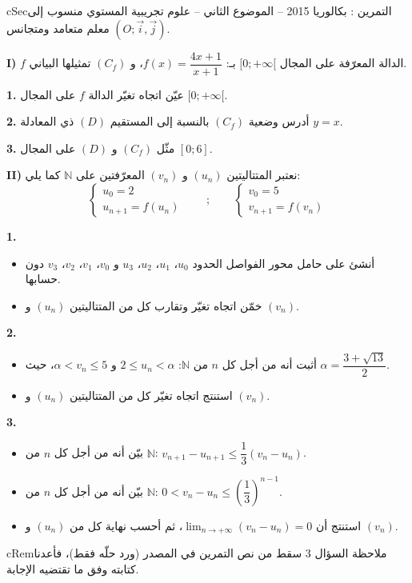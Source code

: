 \documentclass[12pt,a4paper]{article}
\newenvironment{BOX}[2]{\begin{otherlanguage}{english}\begin{arbox}{#1}{#2}}{\end{arbox}\end{otherlanguage}}
\newenvironment{molahada}[1][ملاحظة]{\begin{BOX}{cRem}{#1}}{\end{BOX}}
\newcounter{exo}
\newenvironment{tamrin}[1]{\stepcounter{exo}\begin{BOX}{cSec}{التمرين \theexo: #1}}{\end{BOX}}
\newcommand{\N}{\mathbb{N}}
\newcommand{\limn}{\displaystyle\lim_{n\to+\infty}}
\newenvironment{sq}{\begin{itemize}[leftmargin=2.4em,itemsep=3pt]}{\end{itemize}}
\newcommand{\qa}{\item[(أ)]}\newcommand{\qb}{\item[(ب)]}\newcommand{\qc}{\item[(جـ)]}\newcommand{\qd}{\item[(د)]}\newcommand{\qe}{\item[(هـ)]}
\newcommand{\QQ}[1]{\par\smallskip\textbf{#1.} }
\begin{document}
\begin{tamrin}{بكالوريا 2015 -- الموضوع الثاني -- علوم تجريبية}
المستوي منسوب إلى معلم متعامد ومتجانس $(O;\vec i,\vec j)$.

\textbf{I)} $f$ الدالة المعرّفة على المجال $[0;+\infty[$ بـ: $f(x)=\dfrac{4x+1}{x+1}$، و $(C_f)$ تمثيلها البياني.
\QQ{1} عيّن اتجاه تغيّر الدالة $f$ على المجال $[0;+\infty[$.
\QQ{2} أدرس وضعية $(C_f)$ بالنسبة إلى المستقيم $(D)$ ذي المعادلة $y=x$.
\QQ{3} مثّل $(C_f)$ و $(D)$ على المجال $[0;6]$.

\textbf{II)} نعتبر المتتاليتين $(u_n)$ و $(v_n)$ المعرّفتين على $\N$ كما يلي:
\[\begin{cases}u_0=2\\ u_{n+1}=f(u_n)\end{cases}\qquad;\qquad\begin{cases}v_0=5\\ v_{n+1}=f(v_n)\end{cases}\]
\QQ{1}
\begin{sq}
\qa أنشئ على حامل محور الفواصل الحدود $u_0$، $u_1$، $u_2$، $u_3$ و $v_0$، $v_1$، $v_2$، $v_3$ دون حسابها.
\qb خمّن اتجاه تغيّر وتقارب كل من المتتاليتين $(u_n)$ و $(v_n)$.
\end{sq}
\QQ{2}
\begin{sq}
\qa أثبت أنه من أجل كل $n$ من $\N$: $2\leqslant u_n<\alpha$ و $\alpha<v_n\leqslant 5$، حيث $\alpha=\dfrac{3+\sqrt{13}}{2}$.
\qb استنتج اتجاه تغيّر كل من المتتاليتين $(u_n)$ و $(v_n)$.
\end{sq}
\QQ{3}
\begin{sq}
\qa بيّن أنه من أجل كل $n$ من $\N$: $v_{n+1}-u_{n+1}\leqslant\dfrac13(v_n-u_n)$.
\qb بيّن أنه من أجل كل $n$ من $\N$: $0<v_n-u_n\leqslant\left(\dfrac13\right)^{n-1}$.
\qc استنتج أن $\limn(v_n-u_n)=0$، ثم أحسب نهاية كل من $(u_n)$ و $(v_n)$.
\end{sq}
\end{tamrin}

\begin{molahada}
السؤال 3 سقط من نص التمرين في المصدر (ورد حلّه فقط)، فأعدنا كتابته وفق ما تقتضيه الإجابة.
\end{molahada}
\end{document}
